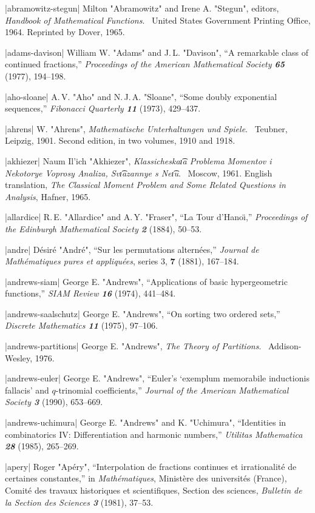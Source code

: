 \bib|abramowitz-stegun|%
Milton "Abramowitz" and Irene A. "Stegun", editors, {\sl Handbook of
Mathematical Functions}. \
 United States Government Printing Office, 1964.
 Reprinted by Dover, 1965.

\bib|adams-davison|%
William W. "Adams" and J.\,L. "Davison",
 ``A remarkable class of continued fractions,''
{\sl Proceedings of the American Mathematical Society\/ \bf65}
(1977), 194--198.

\bib|aho-sloane|%
A.\,V. "Aho" and N.\,J.\,A. "Sloane",
 ``Some doubly exponential sequences,''
{\sl Fibonacci Quarterly\/ \bf11} (1973), 429--437.

\bib|ahrens|%
W. "Ahrens", {\sl Mathematische Unterhaltungen und Spiele}. \
Teubner, Leipzig, 1901.
Second edition, in two volumes, 1910 and 1918.

\bib|akhiezer|%
Naum Il'ich "Akhiezer", {\sl Klassicheska\t\i a Problema Momentov i Nekotorye
Voprosy Analiza, Sv\t\i azannye s Ne\t\i u}. \ Moscow, 1961.
English translation, {\sl The Classical Moment Problem and Some Related Questions
in Analysis},
Hafner, 1965.

\bib|allardice|%
R.\,E. "Allardice" and A.\,Y. "Fraser",
 ``La Tour d'Hano\"\i,''
{\sl Proceedings of the Edinburgh Mathematical Society\/ \bf2} (1884), 50--53.

\bib|andre|%
D\'esir\'e "Andr\'e", ``Sur les permutations altern\'ees,''
{\sl Journal de Math\'ema\-tiques pures et appliqu\'ees}, series 3, {\bf7}
(1881), 167--184.

\bib|andrews-siam|%
George E. "Andrews", ``Applications of basic hypergeometric functions,''
{\sl SIAM Review\/ \bf16} (1974), 441--484.

\bib|andrews-saalschutz|%
George E. "Andrews", ``On sorting two ordered sets,''
{\sl Discrete Mathematics\/ \bf11} (1975), 97--106.

\bib|andrews-partitions|%
George E. "Andrews", {\sl The Theory of Partitions}. \ Addison-Wesley, 1976.

\bib|andrews-euler|%
George E. "Andrews", ``Euler's `exemplum memorabile inductionis
fallacis' and $q$-trinomial coefficients,'' {\sl Journal of the
American Mathematical Society\/ \bf3} (1990), 653--669.

\bib|andrews-uchimura|%
George E. "Andrews" and K. "Uchimura", ``Identities in combinatorics IV:
Differentiation and harmonic numbers,'' {\sl Utilitas Mathematica\/ \bf28}
(1985), 265--269.

\bib|apery|%
Roger "Ap\'ery", ``Interpolation de fractions continues et irrationalit\'e
de certaines constantes,'' in {\sl Math\'ematiques}, Minist\`ere
des universit\'es (France), Comit\'e
des travaux historiques et scientifiques, Section des sciences,
{\sl Bulletin de la Section des Sciences\/ \bf3} (1981), 37--53.


